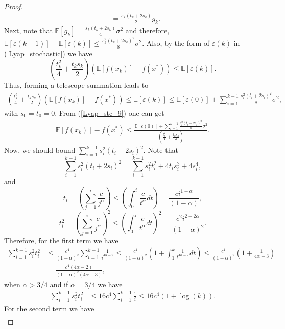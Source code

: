 \documentclass{article}
\theoremstyle{plain}
\theoremstyle{definition}
\theoremstyle{remark}
\begin{document}
\begin{proof}
\begin{align}
         &=\frac{s_k(t_k+2s_k)}{2}g_k.
        \end{align}
        Next, note that $\mathbb E[g_k]= \frac{s_k(t_k+2s_k)}{4}\sigma^2$ and therefore, $\mathbb E [\varepsilon(k+1)]-\mathbb E[ \varepsilon (k)]\leq \frac{s_k^2(t_k+2s_k)^2}{8}\sigma^2$. Also, by the form of $\varepsilon(k)$ in (\ref{Lyap_stochastic}) we have $$(\frac{t_k^2}{4}+\frac{t_{k}s_k}{2})(\mathbb E[f(x_k)]-f(x^*))\leq \mathbb E[\varepsilon(k)].$$
        Thus, forming a telescope summation leads to
        \begin{align}\label{Lyap_stc_9}
            (\frac{t_k^2}{4}+\frac{t_{k}s_k}{2})(\mathbb E[f(x_k)]-f(x^*))\leq\mathbb E[\varepsilon(k)]\leq \mathbb E[\varepsilon(0)] + \sum_{i=1}^{k-1} \frac{s_i^2(t_i+2s_i)^2}{8}\sigma^2,
        \end{align}
        with $s_0=t_0=0$. From (\ref{Lyap_stc_9}) one can get
        \begin{align}\label{Lyap_stc_10}
            \mathbb E[f(x_k)]-f(x^*) \leq \frac{\mathbb E[\varepsilon(0)] + \sum_{i=1}^{k-1} \frac{s_i^2(t_i+2s_i)^2}{8}\sigma^2}{(\frac{t_k^2}{4}+\frac{t_{k}s_k}{2})}.
        \end{align}
        Now, we should bound $\sum_{i=1}^{k-1} s_i^2(t_i+2s_i)^2$. Note that 
        $$\sum_{i=1}^{k-1} s_i^2(t_i+2s_i)^2=\sum_{i=1}^{k-1} s_i^2t_i^2+4t_is_i^3+4s_i^4,$$
        and
        $$t_i=\left(\sum_{j=1}^i\frac{c}{j^{\alpha}}\right)\leq \left(\int_{0}^{i} \frac{c}{t^{\alpha}}dt\right)=\frac{ci^{1-\alpha}}{(1-\alpha)},$$
        $$t_i^2=\left(\sum_{j=1}^i\frac{c}{j^{\alpha}}\right)^2\leq \left(\int_{0}^{i} \frac{c}{t^{\alpha}}dt\right)^2=\frac{c^2i^{2-2\alpha}}{(1-\alpha)^2}.$$
        Therefore, for the first term we have 
        \begin{align}\label{Lyap_stc_11}
            \sum_{i=1}^{k-1} s_i^2t_i^2&\leq \frac{c^4}{(1-\alpha)^2}\sum_{i=1}^{k-1} \frac{1}{i^{4\alpha -2}}\leq \frac{c^4}{(1-\alpha)^2}(1+\int_{1}^{k} \frac{1}{t^{4\alpha -2}}dt)\leq \frac{c^4}{(1-\alpha)^2}(1+\frac{1}{4\alpha-3})\nonumber\\
            &=\frac{c^4(4\alpha -2)}{(1-\alpha)^2(4\alpha-3)},
        \end{align}
        when $\alpha > 3/4$ and if $\alpha=3/4$ we have
        \begin{align}\label{Lyap_stc_12}
            \sum_{i=1}^{k-1} s_i^2t_i^2&\leq 16c^4\sum_{i=1}^{k-1}\frac{1}{i}\leq 16c^4(1+\log (k)).
        \end{align}
        For the second term we have
        \begin{align}\label{Lyap_stc_13}

\end{align}
\end{proof}
\end{document}
